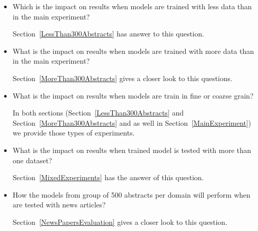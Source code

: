 \documentclass[thesis=M,english]{FITthesis}[2018/05/30]
\begin{document}
\begin{itemize}
	\item Which is the impact on results when models are trained with less data than in the main experiment?
	
	Section~\ref{LessThan300Abstracts} has answer to this question.
	
	\item What is the impact on results when models are trained with more data than in the main experiment? 
	
	Section~\ref{MoreThan300Abstracts} gives a closer look to this questions.
	
	\item What is the impact on results when models are train in fine or coarse grain? 
	
	In both sections (Section~\ref{LessThan300Abstracts} and Section~\ref{MoreThan300Abstracts} and as well in Section~\ref{MainExperiment}) we provide those types of experiments.
	
	\item What is the impact on results when trained model is tested with more than one dataset? 
	
	Section~\ref{MixedExperiments} has the answer of this question.
	
	\item How the models from group of 500 abstracts per domain will perform when are tested with news articles?
	
	Section~\ref{NewsPapersEvaluation} gives a closer look to this question.

\end{itemize}

\end{document}
